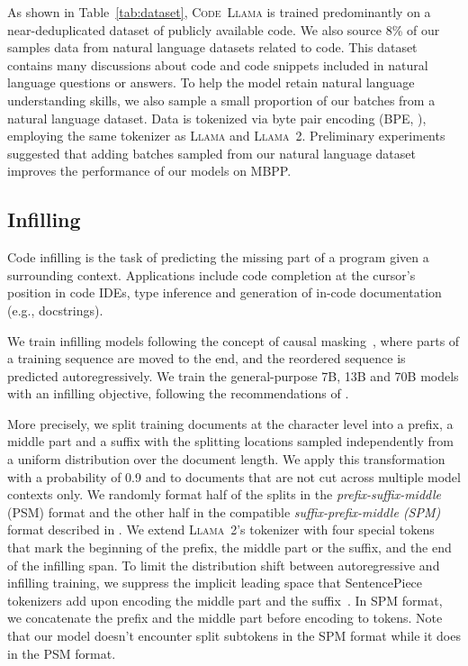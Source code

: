 As shown in Table~\ref{tab:dataset}, \textsc{Code~Llama} is trained predominantly on a near-deduplicated dataset of publicly available code. We also source 8\% of our samples data from natural language datasets related to code. This dataset contains many discussions about code and code snippets included in natural language questions or answers. To help the model retain natural language understanding skills, we also sample a small proportion of our batches from a natural language dataset. Data is tokenized via byte pair encoding (BPE, \citet{sennrich2016neural}), employing the same tokenizer as \textsc{Llama} and \textsc{Llama~2}.
Preliminary experiments suggested that adding batches sampled from our natural language dataset improves the performance of our models on MBPP. 

\subsection{Infilling}
\label{sec:infilling}

Code infilling is the task of predicting the missing part of a program given a surrounding context. Applications include code completion at the cursor's position in code IDEs, type inference and generation of in-code documentation (e.g., docstrings). 

We train infilling models following the concept of causal masking~\citep{aghajanyan2022cm3,fried2022incoder}, where parts of a training sequence are moved to the end, and the reordered sequence is predicted autoregressively. We train the general-purpose 7B, 13B and 70B models with an infilling objective, following the recommendations of \citet{bavarian2022efficient}.

More precisely, we split training documents at the character level into a prefix, a middle part and a suffix with the splitting locations sampled independently from a uniform distribution over the document length. We apply this transformation with a probability of 0.9 and  to documents that are not cut across multiple model contexts only. We randomly format half of the splits in the \emph{prefix-suffix-middle} (PSM) format and the other half in the compatible \emph{suffix-prefix-middle (SPM)} format described in \citet[App. D]{bavarian2022efficient}. We extend \textsc{Llama~2}'s tokenizer with four special tokens that mark the beginning of the prefix, the middle part or the suffix, and the end of the infilling span. To limit the distribution shift between autoregressive and infilling training, we suppress the implicit leading space that SentencePiece tokenizers add upon encoding the middle part and the suffix~\citep{kudo2018sentencepiece}. In SPM format, we concatenate the prefix and the middle part before encoding to tokens. Note that our model doesn't encounter split subtokens in the SPM format while it does in the PSM format.

